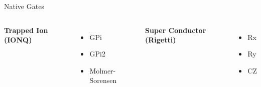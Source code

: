 \documentclass{beamer}
\begin{document}

\begin{frame}{Native Gates}
    \begin{columns}
        \textbf{Trapped Ion (IONQ)}\vfill
        \begin{itemize}
            \item GPi
            \item GPi2
            \item Molmer-Sorensen
        \end{itemize}
        \textbf{Super Conductor (Rigetti)}\vfill
        \begin{itemize}
            \item Rx
            \item Ry
            \item CZ
        \end{itemize}
    \end{columns}
\end{frame}

\end{document}

